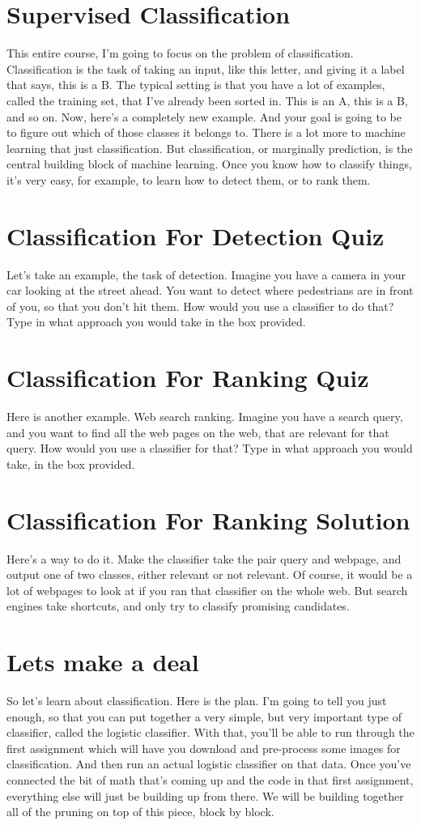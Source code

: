 \documentclass{article}
\begin{document}
\section{Supervised Classification}
This entire course, I'm going to focus
on the problem of classification.
Classification is the task of taking
an input, like this letter, and
giving it a label that says,
this is a B.
The typical setting is that
you have a lot of examples,
called the training set,
that I've already been sorted in.
This is an A, this is a B, and so on.
Now, here's a completely new example.
And your goal is going to be to
figure out which of those classes
it belongs to.
There is a lot more to machine
learning that just classification.
But classification, or
marginally prediction, is the central
building block of machine learning.
Once you know how to classify things,
it's very easy, for
example, to learn how to detect them,
or to rank them.
\section{Classification For Detection Quiz}
Let's take an example,
the task of detection.
Imagine you have a camera in your
car looking at the street ahead.
You want to detect where
pedestrians are in front of you, so
that you don't hit them.
How would you use
a classifier to do that?
Type in what approach you would
take in the box provided.
\section{Classification For Ranking Quiz}
Here is another example.
Web search ranking.
Imagine you have a search query, and
you want to find all the web pages on
the web, that are relevant for
that query.
How would you use a classifier for that?
Type in what approach you would take,
in the box provided.
\section{Classification For Ranking Solution}
Here's a way to do it.
Make the classifier take
the pair query and webpage, and
output one of two classes,
either relevant or not relevant.
Of course, it would be a lot of
webpages to look at if you ran
that classifier on the whole web.
But search engines take shortcuts, and
only try to classify
promising candidates.
\section{Lets make a deal}
So let's learn about classification.
Here is the plan.
I'm going to tell you just enough, so
that you can put together a very simple,
but very important type of classifier,
called the logistic classifier.
With that, you'll be able to run through
the first assignment which will have you
download and pre-process some images for
classification.
And then run an actual logistic
classifier on that data.
Once you've connected the bit of math
that's coming up and the code in
that first assignment, everything else
will just be building up from there.
We will be building together all of
the pruning on top of this piece,
block by block.
\end{document}

